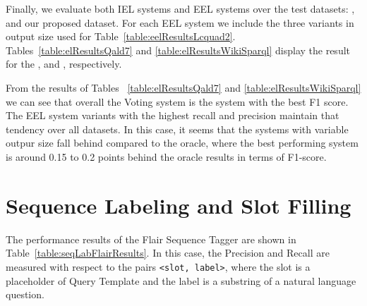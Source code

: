 Finally, we evaluate both IEL systems and EEL systems over the test datasets: \QALDseven{}, and our 
proposed \WikiSPARQL{} dataset. For each EEL system we include the three variants in output size
used for Table~\ref{table:eelResultsLcquad2}. Tables~\ref{table:elResultsQald7} and \ref{table:elResultsWikiSparql} 
display the result for the \QALDseven{}, and \WikiSPARQL{}, respectively.

From the results of Tables ~\ref{table:elResultsQald7} and \ref{table:elResultsWikiSparql} we can 
see that overall the Voting system is the system with the best F1 score. The EEL system variants 
with the highest recall and precision maintain that tendency over all datasets. In this case, it 
seems that the systems with variable outpur size fall behind compared to the oracle, where the 
best performing system is around 0.15 to 0.2 points behind the oracle results in terms of F1-score. 

\section{Sequence Labeling and Slot Filling}
\label{cap5:results/seqLabSlotFilling}

The performance results of the Flair Sequence Tagger are shown in Table~\ref{table:seqLabFlairResults}. 
In this case, the Precision and Recall are measured with respect to the pairs \texttt{<slot, label>}, 
where the slot is a placeholder of Query Template and the label is a substring of a natural 
language question.

